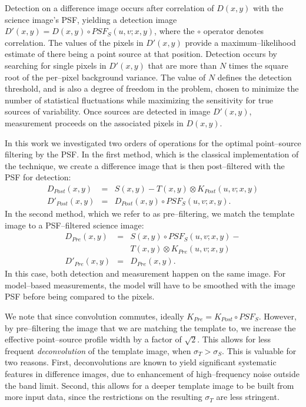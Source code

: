 \documentclass[iop]{emulateapj}
\begin{document}
Detection on a difference image occurs after correlation of $D(x,y)$ with the science image's PSF, yielding a detection image $D'(x,y) = D(x,y) \circ PSF_S(u,v;x,y)$, where the $\circ$ operator denotes correlation.
The values of the pixels in $D'(x,y)$ provide a maximum--likelihood estimate of there being a point source at that position.
Detection occurs by searching for single pixels in $D'(x,y)$ that are more than $N$ times the square root of the per--pixel background variance.
The value of $N$ defines the detection threshold, and is also a degree of freedom in the problem, chosen to minimize the number of statistical fluctuations while maximizing the sensitivity for true sources of variability.
Once sources are detected in image $D'(x,y)$, measurement proceeds on the associated pixels in $D(x,y)$.

In this work we investigated two orders of operations for the optimal point--source filtering by the PSF.
In the first method, which is the classical implementation of the technique, we create a difference image that is then post--filtered with the PSF for detection:
\begin{eqnarray}
D_{Post}(x,y) & = & S(x,y) - T(x,y) \otimes K_{Post}(u,v;x,y)  \nonumber \\
D'_{Post}(x,y) & = & D_{Post}(x,y) \circ PSF_S(u,v;x,y).  \nonumber
\end{eqnarray}
In the second method, which we refer to as pre--filtering, we match the template image to a PSF--filtered science image:
\begin{eqnarray}
D_{Pre}(x,y)  & = & S(x,y) \circ PSF_S(u,v;x,y) - \nonumber \\
             &   & T(x,y) \otimes K_{Pre}(u,v;x,y) \nonumber \\
D'_{Pre}(x,y) & = & D_{Pre}(x,y). \nonumber
\end{eqnarray}
In this case, both detection and measurement happen on the same image.
For model--based measurements, the model will have to be smoothed with the image PSF before being compared to the pixels.

We note that since convolution commutes, ideally $K_{Pre} = K_{Post} \circ PSF_S$.
However, by pre--filtering the image that we are matching the template to, we increase the effective point--source profile width by a factor of $\sqrt{2}$.
This allows for less frequent {\it deconvolution} of the template image, when $\sigma_T > \sigma_S$.
This is valuable for two reasons.
First, deconvolutions are known to yield significant systematic features in difference images, due to enhancement of high--frequency noise outside the band limit.
Second, this allows for a deeper template image to be built from more input data, since the restrictions on the resulting $\sigma_T$ are less stringent.
\end{document}
